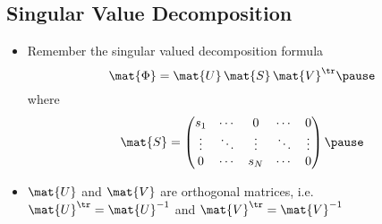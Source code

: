 \begin{slide}
\section{Singular Value Decomposition}

\begin{PauseHighLight}
\hypertarget{pseudo-inverse}{}

\begin{itemize}\squeeze
\item Remember the singular valued decomposition formula
  \begin{displaymath}
    \mat{\Phi} = \mat{U}\, \mat{S}\, \mat{V}^\tr\pause
  \end{displaymath}
  where
  \begin{displaymath}
    \mat{S} = 
    \begin{pmatrix}
      s_1 & \cdots & 0 & \cdots & 0  \\
      \vdots & \ddots & \vdots & \ddots & \vdots  \\
      0 & \cdots & s_N & \cdots & 0 \\
    \end{pmatrix}\pause
  \end{displaymath}
\item $\mat{U}$ and $\mat{V}$ are orthogonal matrices,
  i.e. $\mat{U}^\tr = \mat{U}^{-1}$ and $\mat{V}^\tr = \mat{V}^{-1}$\pause
\end{itemize}

\end{PauseHighLight}
\end{slide}


